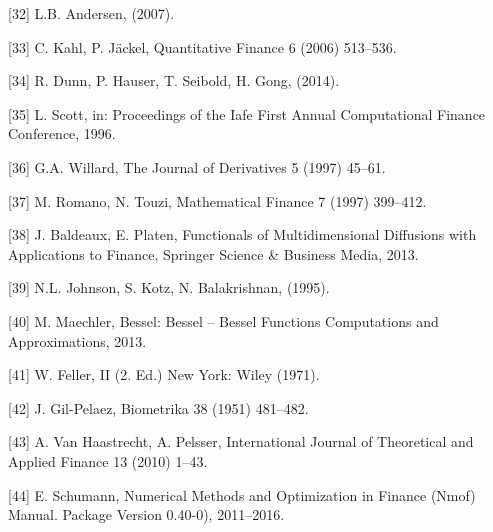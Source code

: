 \documentclass[12pt,twoside]{reedthesis}
\theoremstyle{definition}
\theoremstyle{definition}
\theoremstyle{remark}
\begin{document}
  \hypertarget{ref-andersen}{}
  {[}32{]} L.B. Andersen, (2007).
  
  \hypertarget{ref-kahl2006fast}{}
  {[}33{]} C. Kahl, P. Jäckel, Quantitative Finance 6 (2006) 513--536.
  
  \hypertarget{ref-dunn2014estimating}{}
  {[}34{]} R. Dunn, P. Hauser, T. Seibold, H. Gong, (2014).
  
  \hypertarget{ref-scott1996}{}
  {[}35{]} L. Scott, in: Proceedings of the Iafe First Annual
  Computational Finance Conference, 1996.
  
  \hypertarget{ref-willard1997}{}
  {[}36{]} G.A. Willard, The Journal of Derivatives 5 (1997) 45--61.
  
  \hypertarget{ref-romano1997}{}
  {[}37{]} M. Romano, N. Touzi, Mathematical Finance 7 (1997) 399--412.
  
  \hypertarget{ref-baldeaux}{}
  {[}38{]} J. Baldeaux, E. Platen, Functionals of Multidimensional
  Diffusions with Applications to Finance, Springer Science \& Business
  Media, 2013.
  
  \hypertarget{ref-johnson1995}{}
  {[}39{]} N.L. Johnson, S. Kotz, N. Balakrishnan, (1995).
  
  \hypertarget{ref-besselpkg}{}
  {[}40{]} M. Maechler, Bessel: Bessel -- Bessel Functions Computations
  and Approximations, 2013.
  
  \hypertarget{ref-feller1971introduction}{}
  {[}41{]} W. Feller, II (2. Ed.) New York: Wiley (1971).
  
  \hypertarget{ref-gil1951note}{}
  {[}42{]} J. Gil-Pelaez, Biometrika 38 (1951) 481--482.
  
  \hypertarget{ref-van2010efficient}{}
  {[}43{]} A. Van Haastrecht, A. Pelsser, International Journal of
  Theoretical and Applied Finance 13 (2010) 1--43.
  
  \hypertarget{ref-nmofpack}{}
  {[}44{]} E. Schumann, Numerical Methods and Optimization in Finance
  (Nmof) Manual. Package Version 0.40-0), 2011--2016.


\end{document}
